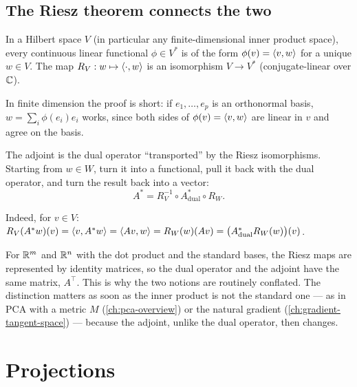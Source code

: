 \begin{notechapter}
\subsection{The Riesz theorem connects the two}

\begin{theorem}\label{adjoint-operator:thm:riesz}
In a Hilbert space $V$ (in particular any finite-dimensional inner product space),
every continuous linear functional $\phi\in V^*$ is of the form
$\phi(v) = \left\langle v, w \right\rangle$ for a unique $w\in V$. The map $R_V:w\mapsto\left\langle \cdot, w \right\rangle$ is
an isomorphism $V\to V^*$ (conjugate-linear over $\mathbb{C}$).
\end{theorem}

In finite dimension the proof is short: if $e_1,\dots,e_p$ is an orthonormal basis,
$w = \sum_i\phi(e_i)e_i$ works, since both sides of $\phi(v) = \left\langle v, w \right\rangle$ are linear in
$v$ and agree on the basis.

The adjoint is the dual operator ``transported'' by the Riesz isomorphisms. Starting
from $w\in W$, turn it into a functional, pull it back with the dual operator, and
turn the result back into a vector:
\[
  A^* = R_V^{-1}\circ A^*_{\text{dual}}\circ R_W .
\]
\begin{center}
\qquad
{}
\end{center}
Indeed, for $v\in V$: $R_V(A^*w)(v) = \left\langle v, A^*w \right\rangle = \left\langle Av, w \right\rangle = R_W(w)(Av) = \bigl(A^*_{\text{dual}}R_W(w)\bigr)(v)$.

\begin{keyidea}
For $\mathbb{R}^m$ and $\mathbb{R}^n$ with the dot product and the standard bases, the Riesz maps
are represented by identity matrices, so the dual operator and the adjoint have the
same matrix, $A^\top$. This is why the two notions are routinely conflated. The
distinction matters as soon as the inner product is not the standard one --- as in
PCA with a metric $M$ (\cref{ch:pca-overview}) or the natural gradient
(\cref{ch:gradient-tangent-space}) --- because the adjoint, unlike the dual
operator, then changes.
\end{keyidea}

\section{Projections}\label{adjoint-operator:sec:projections}


\end{notechapter}
